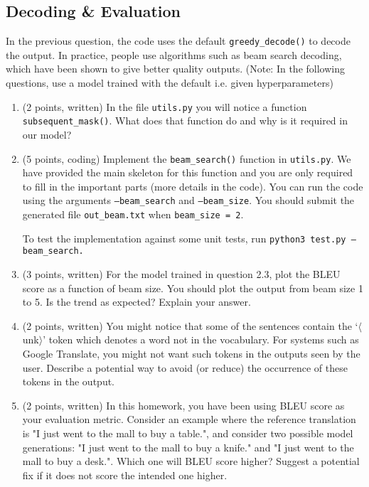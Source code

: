 \documentclass{article}
\theoremstyle{case}
\theoremstyle{definition}
\begin{document}
\newpage
\subsection{Decoding \& Evaluation}

In the previous question, the code uses the default \texttt{greedy\_decode()} to decode the output.  In practice, people use algorithms such as beam search decoding, which have been shown to give better quality outputs. (Note: In the following questions, use a model trained with the default i.e. given hyperparameters)

\begin{enumerate}

    \item (2 points, written) In the file \texttt{utils.py} you will notice a function \texttt{subsequent\_mask()}. What does that function do and why is it required in our model?

    \newpage
    \item (5 points, coding) Implement the \texttt{beam\_search()} function in \texttt{utils.py}. We have provided the main skeleton for this function and you are only required to fill in the important parts (more details in the code). You can run the code using the arguments \texttt{--beam\_search} and \texttt{--beam\_size}. You should submit the generated file \texttt{out\_beam.txt} when \texttt{beam\_size = 2}.
    
    To test the implementation against some unit tests, run \texttt{python3 test.py --beam\_search.}
    

    \newpage
    \item (3 points, written) For the model trained in question 2.3, plot the BLEU score as a function of beam size. You should plot the output from beam size 1 to 5. Is the trend as expected? Explain your answer.


    \newpage
    \item (2 points, written) You might notice that some of the sentences contain the `$\langle$unk$\rangle$' token which denotes a word not in the vocabulary. For systems such as Google Translate, you might not want such tokens in the outputs seen by the user. Describe a potential way to avoid (or reduce) the occurrence of these tokens in the output.


    \newpage
    \item (2 points, written) In this homework, you have been using BLEU score as your evaluation metric. Consider an example where the reference translation is "I just went to the mall to buy a table.", and consider two possible model generations: "I just went to the mall to buy a knife." and "I just went to the mall to buy a desk.". Which one will BLEU score higher? Suggest a potential fix if it does not score the intended one higher.

    
\end{enumerate}
\end{document}
